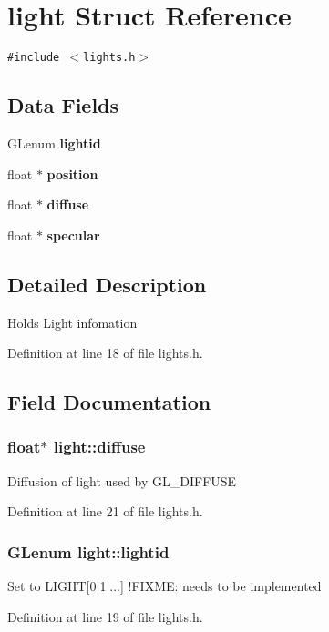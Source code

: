 \section{light Struct Reference}
\label{structlight}
{\tt \#include $<$lights.h$>$}

\subsection*{Data Fields}
\begin{CompactItemize}
\item 
GLenum {\bf lightid}
\item 
float $\ast$ {\bf position}
\item 
float $\ast$ {\bf diffuse}
\item 
float $\ast$ {\bf specular}
\end{CompactItemize}


\subsection{Detailed Description}
Holds Light infomation 



Definition at line 18 of file lights.h.

\subsection{Field Documentation}
\subsubsection{\setlength{\rightskip}{0pt plus 5cm}float$\ast$ {\bf light::diffuse}}\label{structlight_o2}


Diffusion of light used by GL\_\-DIFFUSE 

Definition at line 21 of file lights.h.
\subsubsection{\setlength{\rightskip}{0pt plus 5cm}GLenum {\bf light::lightid}}\label{structlight_o0}


Set to LIGHT[0$|$1$|$...] !FIXME: needs to be implemented 

Definition at line 19 of file lights.h.
